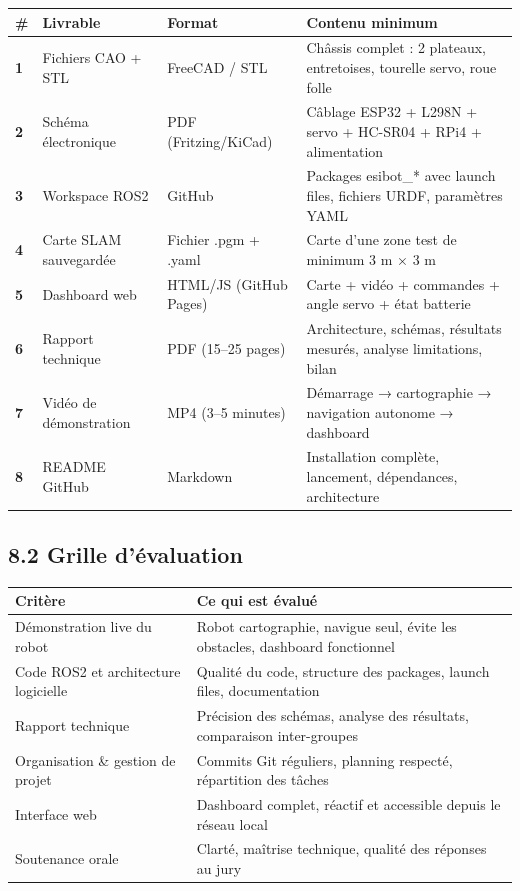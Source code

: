 \documentclass[12pt,a4paper]{article}
\begin{document}
\begin{longtable}{>{\bfseries}p{0.4cm} p{3.5cm} p{3.5cm} p{6cm}}
\toprule
\textbf{\#} & \textbf{Livrable} & \textbf{Format} & \textbf{Contenu minimum} \\
\midrule
\endhead
1 & Fichiers CAO + STL & FreeCAD / STL & Châssis complet : 2 plateaux, entretoises, tourelle servo, roue folle \\[4pt]
2 & Schéma électronique & PDF (Fritzing/KiCad) & Câblage ESP32 + L298N + servo + HC-SR04 + RPi4 + alimentation \\[4pt]
3 & Workspace ROS2 & GitHub & Packages esibot\_* avec launch files, fichiers URDF, paramètres YAML \\[4pt]
4 & Carte SLAM sauvegardée & Fichier .pgm + .yaml & Carte d'une zone test de minimum 3 m × 3 m \\[4pt]
5 & Dashboard web & HTML/JS (GitHub Pages) & Carte + vidéo + commandes + angle servo + état batterie \\[4pt]
6 & Rapport technique & PDF (15–25 pages) & Architecture, schémas, résultats mesurés, analyse limitations, bilan \\[4pt]
7 & Vidéo de démonstration & MP4 (3–5 minutes) & Démarrage → cartographie → navigation autonome → dashboard \\[4pt]
8 & README GitHub & Markdown & Installation complète, lancement, dépendances, architecture \\
\bottomrule
\end{longtable}

\subsection{8.2 Grille d'évaluation}

\begin{longtable}{p{6cm} p{8cm}}
\toprule
\textbf{Critère} & \textbf{Ce qui est évalué} \\
\midrule
\endhead
Démonstration live du robot & Robot cartographie, navigue seul, évite les obstacles, dashboard fonctionnel \\[4pt]
Code ROS2 et architecture logicielle & Qualité du code, structure des packages, launch files, documentation \\[4pt]
Rapport technique & Précision des schémas, analyse des résultats, comparaison inter-groupes \\[4pt]
Organisation \& gestion de projet & Commits Git réguliers, planning respecté, répartition des tâches \\[4pt]
Interface web & Dashboard complet, réactif et accessible depuis le réseau local \\[4pt]
Soutenance orale & Clarté, maîtrise technique, qualité des réponses au jury \\
\bottomrule
\end{longtable}
\end{document}
